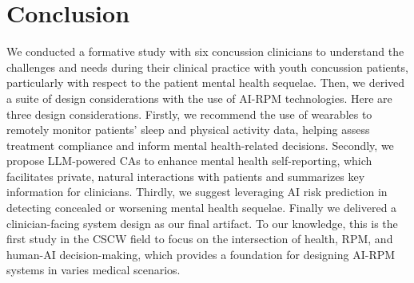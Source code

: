 \section{Conclusion}

We conducted a formative study with six concussion clinicians to understand the challenges and needs during their clinical practice with youth concussion patients, particularly with respect to the patient mental health sequelae. 
Then, we derived a suite of design considerations with the use of AI-RPM technologies. Here are three design considerations. 
Firstly, we recommend the use of wearables to remotely monitor patients’ sleep and physical activity data, helping assess treatment compliance and inform mental health-related decisions. 
Secondly, we propose LLM-powered CAs to enhance mental health self-reporting, which facilitates private, natural interactions with patients and summarizes key information for clinicians. 
Thirdly, we suggest leveraging AI risk prediction in detecting concealed or worsening mental health sequelae.  Finally we delivered a clinician-facing system design as our final artifact. 
To our knowledge, this is the first study in the CSCW field to focus on the intersection of health, RPM, and human-AI decision-making, which provides a foundation for designing AI-RPM systems in varies medical scenarios.